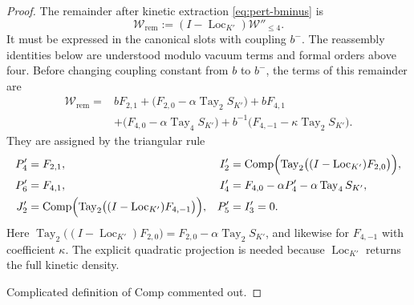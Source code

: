 \documentclass[11pt]{article}
\newcommand{\Id}{I}
\newcommand{\Tay}{\operatorname{Tay}}
\newcommand{\Loc}{\operatorname{Loc}}
\numberwithin{equation}{section}
\theoremstyle{definition}
\theoremstyle{plain}
\begin{document}
\begin{proof}
The remainder after kinetic extraction \eqref{eq:pert-bminus} is
\begin{equation}
 \mathcal W_{\mathrm{rem}}
   :=(\Id-\Loc_{K'})\mathcal W''_{\le4}.
 \label{eq:pert-localized-remainder}
\end{equation}
It must be expressed in the canonical slots with coupling $b^-$.
The reassembly identities below are understood modulo vacuum terms
and formal orders above four.  
%
Before changing coupling constant from $b$ to $b^-$, the
terms of this remainder are
\begin{align}
 \mathcal W_{\mathrm{rem}}
 ={}&bF_{2,1}
       +\bigl(F_{2,0}-\alpha\Tay_2 S_{K'}\bigr)
       +bF_{4,1}\nonumber\\
 &+\bigl(F_{4,0}-\alpha\Tay_4 S_{K'}\bigr)
       +b^{-1}\bigl(F_{4,-1}-\kappa\Tay_2 S_{K'}\bigr).
 \label{eq:pert-remainder-slots}
\end{align}
They are assigned by the triangular rule
\begin{align}
 P'_4&=F_{2,1},&
 I'_2&=\operatorname{Comp}
             \Bigl(\Tay_2\bigl((\Id-\Loc_{K'})
                         F_{2,0}\bigr)\Bigr),\\
 P'_6&=F_{4,1},&
 I'_4&=F_{4,0}-\alpha P'_4-\alpha \Tay_4 S_{K'},\\
 J'_2&=\operatorname{Comp}
             \Bigl(\Tay_2\bigl((\Id-\Loc_{K'})
                         F_{4,-1}\bigr)\Bigr),&
 P'_5&=I'_3=0.
 \label{eq:pert-slot-recursion}
\end{align}
Here $\Tay_2\bigl((\Id-\Loc_{K'})F_{2,0}\bigr)
=F_{2,0}-\alpha \Tay_2 S_{K'}$, and likewise for $F_{4,-1}$
with coefficient $\kappa$.
The explicit quadratic projection is needed because
$\Loc_{K'}$ returns the full kinetic density.

Complicated definition of Comp commented out.


\end{proof}
\end{document}
